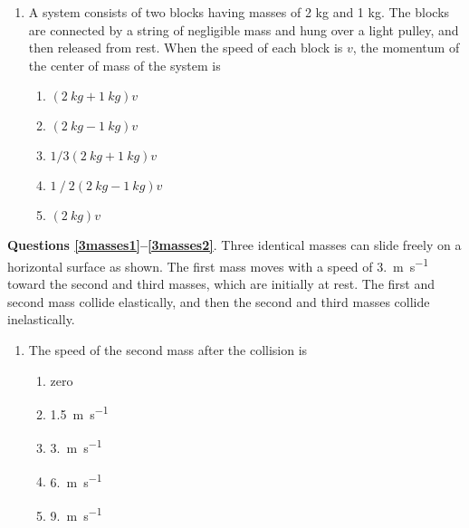 \documentclass{../../../oss-apphys}
\begin{document}
\begin{multicols}{2}
\begin{enumerate}[leftmargin=18pt,resume]
  \item A system consists of two blocks having masses of 2 kg and 1 kg. The
    blocks are connected by a string of negligible mass and hung over a light
    pulley, and then released from rest. When the speed of each block is $v$,
    the momentum of the center of mass of the system is
    \begin{enumerate}[nosep,leftmargin=18pt,label=(\Alph*)]
    \item$(\SI{2}{kg} + \SI{1}{kg})v$
    \item$(\SI{2}{kg} - \SI{1}{kg})v$
    \item$1/3 (\SI{2}{kg} +\SI{1}{kg})v$
    \item$1⁄2 (\SI{2}{kg} -\SI{1}{kg})v$
    \item$(\SI{2}{kg})v$
    \end{enumerate}
  \end{enumerate}
  
  
  \textbf{Questions \ref{3masses1}--\ref{3masses2}}. Three identical masses can
  slide freely on a horizontal surface as shown. The first mass moves with a
  speed of \SI{3.}{\metre\per\second} toward the second and third masses, which
  are initially at rest. The first and second mass collide elastically, and
  then the second and third masses collide inelastically.
  \begin{center}
  \end{center}
  \begin{enumerate}[leftmargin=18pt,resume]
  \item The speed of the second mass after the collision is
    \label{3masses1}
    \begin{enumerate}[nosep,leftmargin=18pt,label=(\Alph*)]
    \item zero
    \item\SI{1.5}{\metre\per\second}
    \item\SI{3.}{\metre\per\second}
    \item\SI{6.}{\metre\per\second}
    \item\SI{9.}{\metre\per\second}
    \end{enumerate}


\end{enumerate}
\end{multicols}
\end{document}
